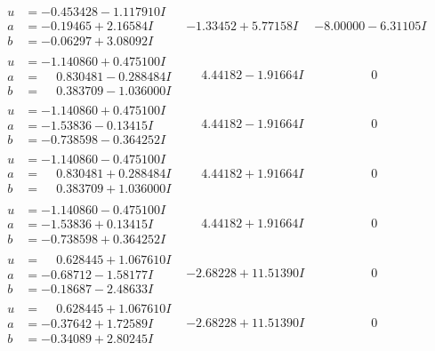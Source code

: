 \documentclass[1p]{elsarticle_modified}
\theoremstyle{definition}
\begin{document}
$$\begin{array}{c|c|c}
\begin{aligned}
u &= -0.453428 - 1.117910 I \\
a &= -0.19465 + 2.16584 I \\
b &= -0.06297 + 3.08092 I\end{aligned}
 & -1.33452 + 5.77158 I & -8.00000 - 6.31105 I \\ \hline\begin{aligned}
u &= -1.140860 + 0.475100 I \\
a &= \phantom{-}0.830481 - 0.288484 I \\
b &= \phantom{-}0.383709 - 1.036000 I\end{aligned}
 & \phantom{-}4.44182 - 1.91664 I & \phantom{-0.000000 } 0 \\ \hline\begin{aligned}
u &= -1.140860 + 0.475100 I \\
a &= -1.53836 - 0.13415 I \\
b &= -0.738598 - 0.364252 I\end{aligned}
 & \phantom{-}4.44182 - 1.91664 I & \phantom{-0.000000 } 0 \\ \hline\begin{aligned}
u &= -1.140860 - 0.475100 I \\
a &= \phantom{-}0.830481 + 0.288484 I \\
b &= \phantom{-}0.383709 + 1.036000 I\end{aligned}
 & \phantom{-}4.44182 + 1.91664 I & \phantom{-0.000000 } 0 \\ \hline\begin{aligned}
u &= -1.140860 - 0.475100 I \\
a &= -1.53836 + 0.13415 I \\
b &= -0.738598 + 0.364252 I\end{aligned}
 & \phantom{-}4.44182 + 1.91664 I & \phantom{-0.000000 } 0 \\ \hline\begin{aligned}
u &= \phantom{-}0.628445 + 1.067610 I \\
a &= -0.68712 - 1.58177 I \\
b &= -0.18687 - 2.48633 I\end{aligned}
 & -2.68228 + 11.51390 I & \phantom{-0.000000 } 0 \\ \hline\begin{aligned}
u &= \phantom{-}0.628445 + 1.067610 I \\
a &= -0.37642 + 1.72589 I \\
b &= -0.34089 + 2.80245 I\end{aligned}
 & -2.68228 + 11.51390 I & \phantom{-0.000000 } 0\\

\end{array}$$
\end{document}
